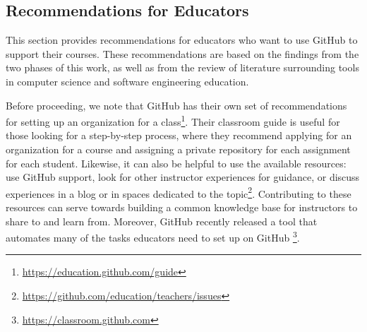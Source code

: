 %


\subsection{Recommendations for Educators}
This section provides recommendations for educators who want to use GitHub to support their courses. These recommendations are based on the findings from the two phases of this work, as well as from the review of literature surrounding tools in computer science and software engineering education.

Before proceeding, we note that GitHub has their own set of recommendations for setting up an organization for a class\footnote{\url{https://education.github.com/guide}}. Their classroom guide is useful for those looking for a step-by-step process, where they recommend applying for an organization for a course and assigning a private repository for each assignment for each student. Likewise, it can also be helpful to use the available resources: use GitHub support, look for other instructor experiences for guidance, or discuss experiences in a blog or in spaces dedicated to the topic\footnote{\url{https://github.com/education/teachers/issues}}. Contributing to these resources can serve towards building a common knowledge base for instructors to share to and learn from. Moreover, GitHub recently released a tool that automates many of the tasks educators need to set up on GitHub \footnote{\url{https://classroom.github.com}}. \\

